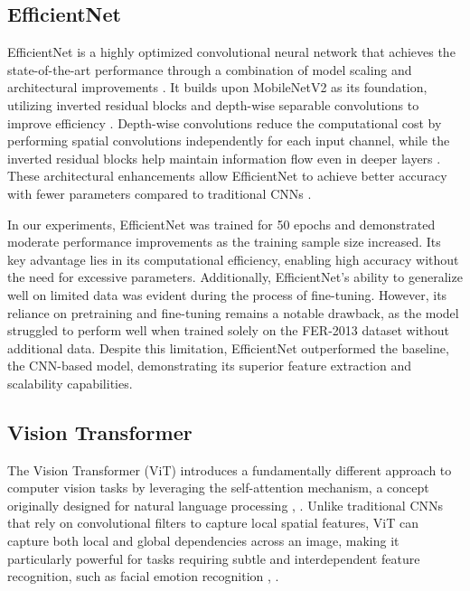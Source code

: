 \documentclass[sigconf]{acmart}
\begin{document}
\subsection{EfficientNet}

EfficientNet is a highly optimized convolutional neural network that achieves the state-of-the-art performance through a combination of model scaling and architectural improvements \cite{tan2019}. It builds upon MobileNetV2 \cite{sandler2018mobilenetv2} as its foundation, utilizing inverted residual blocks and depth-wise separable convolutions to improve efficiency \cite{tan2019}. Depth-wise convolutions reduce the computational cost by performing spatial convolutions independently for each input channel, while the inverted residual blocks help maintain information flow even in deeper layers \cite{tan2019}. These architectural enhancements allow EfficientNet to achieve better accuracy with fewer parameters compared to traditional CNNs \cite{kopalidis2024advances}.

In our experiments, EfficientNet was trained for 50 epochs and demonstrated moderate performance improvements as the training sample size increased. Its key advantage lies in its computational efficiency, enabling high accuracy without the need for excessive parameters. Additionally, EfficientNet's ability to generalize well on limited data was evident during the process of fine-tuning. However, its reliance on pretraining and fine-tuning remains a notable drawback, as the model struggled to perform well when trained solely on the FER-2013 dataset without additional data. Despite this limitation, EfficientNet outperformed the baseline, the CNN-based model, demonstrating its superior feature extraction and scalability capabilities.

\subsection{Vision Transformer}
The Vision Transformer (ViT) introduces a fundamentally different approach to computer vision tasks by leveraging the self-attention mechanism, a concept originally designed for natural language processing \cite{dosovitskiy2020image}, \cite{kopalidis2024advances}. Unlike traditional CNNs that rely on convolutional filters to capture local spatial features, ViT can capture both local and global dependencies across an image, making it particularly powerful for tasks requiring subtle and interdependent feature recognition, such as facial emotion recognition \cite{dosovitskiy2020image}, \cite{kopalidis2024advances}.
\end{document}
